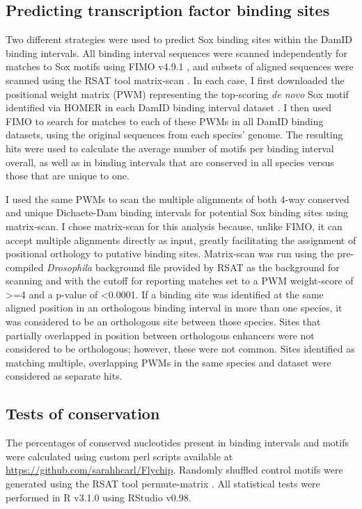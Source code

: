 \subsection{Predicting transcription factor binding sites}
Two different strategies were used to predict Sox binding sites within the DamID binding intervals. All binding interval sequences were scanned independently for matches to Sox motifs using FIMO v4.9.1 \citep{grant_fimo:_2011}, and subsets of aligned sequences were scanned using the RSAT tool matrix-scan \citep{sand_analyzing_2008,turatsinze_using_2008}. In each case, I first downloaded the positional weight matrix (PWM) representing the top-scoring \emph{de novo} Sox motif identified via HOMER in each DamID binding interval dataset \citep{heinz_simple_2010}. I then used FIMO to search for matches to each of these PWMs in all DamID binding datasets, using the original sequences from each species’ genome. The resulting hits were used to calculate the average number of motifs per binding interval overall, as well as in binding intervals that are conserved in all species versus those that are unique to one.

I used the same PWMs to scan the multiple alignments of both 4-way conserved and unique Dichaete-Dam binding intervals for potential Sox binding sites using matrix-scan. I chose matrix-scan for this analysis because, unlike FIMO, it can accept multiple alignments directly as input, greatly facilitating the assignment of positional orthology to putative binding sites. Matrix-scan was run using the pre-compiled \emph{Drosophila} background file provided by RSAT as the background for scanning and with the cutoff for reporting matches set to a PWM weight-score of \textgreater=4 and a p-value of \textless 0.0001. If a binding site was identified at the same aligned position in an orthologous binding interval in more than one species, it was considered to be an orthologous site between those species. Sites that partially overlapped in position between orthologous enhancers were not considered to be orthologous; however, these were not common. Sites identified as matching multiple, overlapping PWMs in the same species and dataset were considered as separate hits. 

\subsection{Tests of conservation}
The percentages of conserved nucleotides present in binding intervals and motifs were calculated using custom perl scripts available at \url{https://github.com/sarahhcarl/Flychip}. Randomly shuffled control motifs were generated using the RSAT tool permute-matrix \citep{thomas-chollier_rsat_2011}. All statistical tests were performed in R v3.1.0 using RStudio v0.98.
